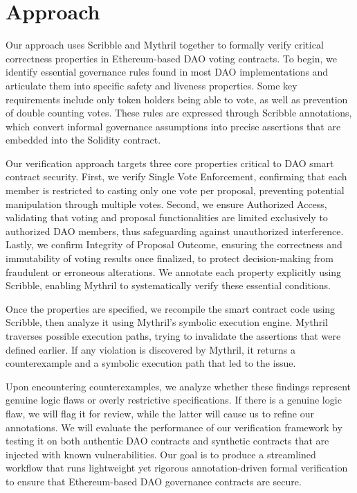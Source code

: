 \documentclass[conference]{IEEEtran}
\begin{document}
\section{Approach}
Our approach uses Scribble and Mythril together to formally verify critical correctness properties in Ethereum-based DAO voting contracts. To begin, we identify essential governance rules found in most DAO implementations and articulate them into specific safety and liveness properties. Some key requirements include only token holders being able to vote, as well as prevention of double counting votes. These rules are expressed through Scribble annotations, which convert informal governance assumptions into precise assertions that are embedded into the Solidity contract. 

Our verification approach targets three core properties critical to DAO smart contract security. First, we verify Single Vote Enforcement, confirming that each member is restricted to casting only one vote per proposal, preventing potential manipulation through multiple votes. Second, we ensure Authorized Access, validating that voting and proposal functionalities are limited exclusively to authorized DAO members, thus safeguarding against unauthorized interference. Lastly, we confirm Integrity of Proposal Outcome, ensuring the correctness and immutability of voting results once finalized, to protect decision-making from fraudulent or erroneous alterations. We annotate each property explicitly using Scribble, enabling Mythril to systematically verify these essential conditions.

Once the properties are specified, we recompile the smart contract code using Scribble, then analyze it using Mythril’s symbolic execution engine. Mythril traverses possible execution paths, trying to invalidate the assertions that were defined earlier. If any violation is discovered by Mythril, it returns a counterexample and a symbolic execution path that led to the issue.

Upon encountering counterexamples, we analyze whether these findings represent genuine logic flaws or overly restrictive specifications. If there is a genuine logic flaw, we will flag it for review, while the latter will cause us to refine our annotations. We will evaluate the performance of our verification framework by testing it on both authentic DAO contracts and synthetic contracts that are injected with known vulnerabilities. Our goal is to produce a streamlined workflow that runs lightweight yet rigorous annotation-driven formal verification to ensure that Ethereum-based DAO governance contracts are secure.
\end{document}
